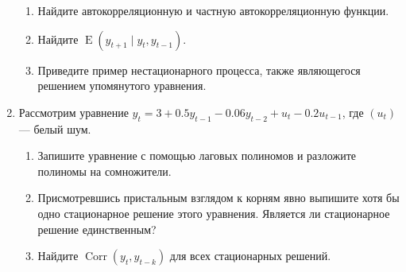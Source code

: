 \documentclass[12pt]{article}
\DeclareMathOperator{\Corr}{Corr}
\DeclareMathOperator{\E}{E}
\begin{document}
\begin{enumerate}
\begin{enumerate}
	\item Найдите автокорреляционную и частную автокорреляционную функции. 
	\item Найдите $\E(y_{t+1} \mid y_{t}, y_{t-1})$.
	\item Приведите пример нестационарного процесса, также являющегося решением упомянутого уравнения.
\end{enumerate}


\item Рассмотрим уравнение $y_t = 3 + 0.5 y_{t-1} - 0.06 y_{t-2} + u_t - 0.2 u_{t-1}$, где $(u_t)$ — белый шум. 

\begin{enumerate}
	\item Запишите уравнение с помощью лаговых полиномов и разложите полиномы на сомножители. 
	\item Присмотревшись пристальным взглядом к корням явно выпишите хотя бы одно стационарное решение этого уравнения. 
	Является ли стационарное решение единственным?
	\item Найдите $\Corr(y_t, y_{t-k})$ для всех стационарных решений. 
\end{enumerate}



\end{enumerate}
\end{document}
